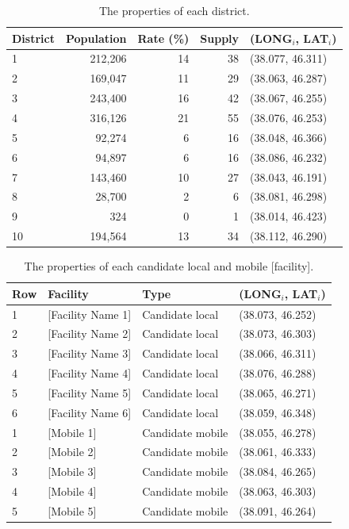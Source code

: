 \documentclass[10pt,twocolumn]{article}
\newcommand{\tabfont}{\fontsize{8}{9.5}\selectfont}
\newcommand{\headfont}{\fontsize{8.5}{10}\selectfont\bfseries}
\begin{document}
\begin{table}[H]
\caption{The properties of each district.}
\label{tab:districts}
\tabfont
\setlength{\tabcolsep}{4pt}
\begin{tabular}{lrrrp{2.0cm}}
\toprule
\headfont District & \headfont Population
  & \headfont Rate (\%) & \headfont Supply
  & \headfont (LONG$_i$, LAT$_i$) \\
\midrule
1  & 212,206 & 14 & 38 & (38.077, 46.311) \\
2  & 169,047 & 11 & 29 & (38.063, 46.287) \\
3  & 243,400 & 16 & 42 & (38.067, 46.255) \\
4  & 316,126 & 21 & 55 & (38.076, 46.253) \\
5  &  92,274 &  6 & 16 & (38.048, 46.366) \\
6  &  94,897 &  6 & 16 & (38.086, 46.232) \\
7  & 143,460 & 10 & 27 & (38.043, 46.191) \\
8  &  28,700 &  2 &  6 & (38.081, 46.298) \\
9  &     324 &  0 &  1 & (38.014, 46.423) \\
10 & 194,564 & 13 & 34 & (38.112, 46.290) \\
\bottomrule
\end{tabular}
\end{table}

\begin{table}[H]
\caption{The properties of each candidate local and mobile
[facility].}
\label{tab:facilities}
\tabfont
\setlength{\tabcolsep}{4pt}
\begin{tabular}{lp{3.2cm}lp{2.0cm}}
\toprule
\headfont Row & \headfont Facility
  & \headfont Type & \headfont (LONG$_i$, LAT$_i$) \\
\midrule
1 & [Facility Name 1] & Candidate local  & (38.073, 46.252) \\
2 & [Facility Name 2] & Candidate local  & (38.073, 46.303) \\
3 & [Facility Name 3] & Candidate local  & (38.066, 46.311) \\
4 & [Facility Name 4] & Candidate local  & (38.076, 46.288) \\
5 & [Facility Name 5] & Candidate local  & (38.065, 46.271) \\
6 & [Facility Name 6] & Candidate local  & (38.059, 46.348) \\
\midrule
1 & [Mobile 1]        & Candidate mobile & (38.055, 46.278) \\
2 & [Mobile 2]        & Candidate mobile & (38.061, 46.333) \\
3 & [Mobile 3]        & Candidate mobile & (38.084, 46.265) \\
4 & [Mobile 4]        & Candidate mobile & (38.063, 46.303) \\
5 & [Mobile 5]        & Candidate mobile & (38.091, 46.264) \\
\bottomrule
\end{tabular}
\end{table}
\end{document}
